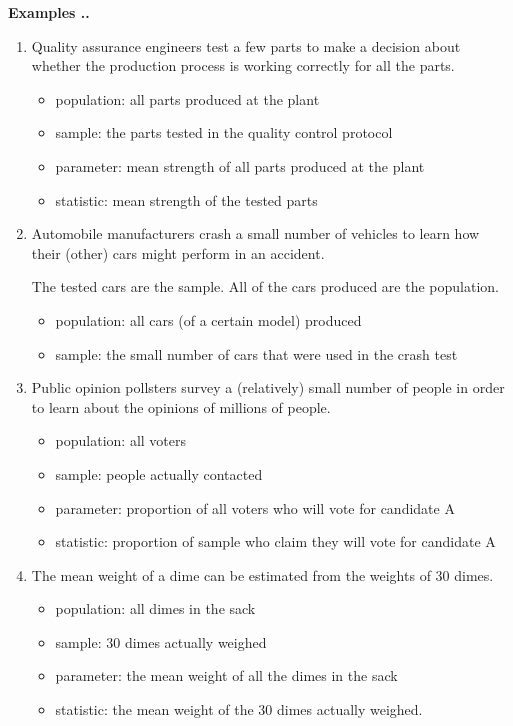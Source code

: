 \documentclass[twoside]{book}\usepackage[]{graphicx}\usepackage[]{xcolor}
\newcounter{example}[section]
\newenvironment{examples}%
{\refstepcounter{example}%
\textbf{Examples \thesection.\arabic{example}. }}%
{}
\begin{document}
\begin{examples}
\begin{enumerate}
	\item
		Quality assurance engineers test a few parts to make a decision about 
		whether the production process is working correctly for all the parts.  
	\begin{itemize}
		\item
			population: all parts produced at the plant
		\item
			sample: the parts tested in the quality control protocol
		\item
			parameter: mean strength of all parts produced at the plant
		\item
			statistic: mean strength of the tested parts
	\end{itemize}

	\item 
	Automobile manufacturers crash a small number of vehicles to learn how
	their (other) cars might perform in an accident.  

		The tested cars are the sample.  All of the cars produced are the population.
	\begin{itemize}
		\item
			population: all cars (of a certain model) produced
		\item
			sample: the small number of cars that were used in the crash test
	\end{itemize}

\item 
	Public opinion pollsters survey a (relatively) small number of people in order to learn
about the opinions of millions of people.

	\begin{itemize}
		\item
			population: all voters
		\item
			sample: people actually contacted
		\item
			parameter: proportion of all voters who will vote for candidate A
		\item
			statistic: proportion of sample who claim they will vote for candidate A
	\end{itemize}

\item
	The mean weight of a dime can be estimated from the weights of 30 dimes.

	\begin{itemize}
		\item
			population: all dimes in the sack  
		\item
			sample: 30 dimes actually weighed
		\item
			parameter: the mean weight of all the dimes in the sack
		\item
			statistic: the mean weight of the 30 dimes actually weighed.
	\end{itemize}

\end{enumerate}
\end{examples}
\end{document}
